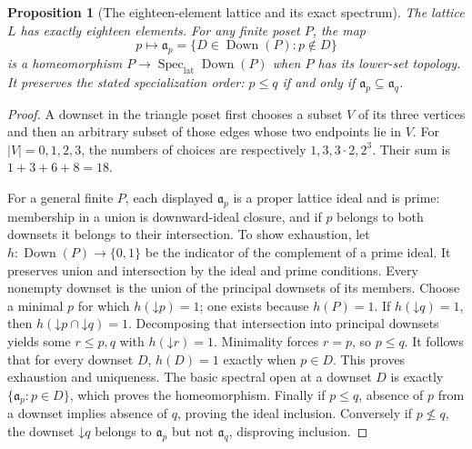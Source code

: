 \documentclass[11pt,a4paper]{article}
\newtheorem{proposition}[theorem]{Proposition}
\theoremstyle{definition}\newtheorem{definition}[theorem]{Definition}
\newcommand{\SpecLat}{\operatorname{Spec}_{\mathrm{lat}}}
\providecommand{\Down}{\operatorname{Down}}
\begin{document}
\begin{proposition}[The eighteen-element lattice and its exact spectrum]
\label{FL:prop:triangle-lattice}
The lattice $L$ has exactly eighteen elements. For any finite poset
$P$, the map
\[
 p\longmapsto\mathfrak a_p=\{D\in\Down(P):p\notin D\}
 \tag{FL33}\label{FL:eq:poset-primes}
\]
is a homeomorphism $P\to\SpecLat\Down(P)$ when $P$ has its lower-set
topology. It preserves the stated specialization order: $p\le q$
if and only if $\mathfrak a_p\subseteq\mathfrak a_q$.
\end{proposition}
\begin{proof}
A downset in the triangle poset first chooses a subset $V$ of its
three vertices and then an arbitrary subset of those edges whose
two endpoints lie in $V$. For $|V|=0,1,2,3$, the numbers of choices
are respectively $1,3,3\cdot2,2^3$. Their sum is
$1+3+6+8=18$.

For a general finite $P$, each displayed $\mathfrak a_p$ is a proper
lattice ideal and is prime: membership in a union is downward-ideal
closure, and if $p$ belongs to both downsets it belongs to their
intersection. To show exhaustion, let $h:\Down(P)\to\{0,1\}$ be the
indicator of the complement of a prime ideal. It preserves union
and intersection by the ideal and prime conditions. Every nonempty
downset is the union of the principal downsets of its members.
Choose a minimal $p$ for which $h(\mathord\downarrow p)=1$; one exists
because $h(P)=1$. If $h(\mathord\downarrow q)=1$, then
$h(\mathord\downarrow p\cap\mathord\downarrow q)=1$. Decomposing that
intersection into principal downsets yields some $r\le p,q$ with
$h(\mathord\downarrow r)=1$. Minimality forces $r=p$, so $p\le q$.
It follows that for every downset $D$, $h(D)=1$ exactly when $p\in D$.
This proves exhaustion and uniqueness. The basic spectral open at a
downset $D$ is exactly $\{\mathfrak a_p:p\in D\}$, which proves the
homeomorphism. Finally if $p\le q$, absence of $p$ from a downset
implies absence of $q$, proving the ideal inclusion. Conversely if
$p\not\le q$, the downset $\mathord\downarrow q$ belongs to
$\mathfrak a_p$ but not $\mathfrak a_q$, disproving inclusion.
\end{proof}
\end{document}
